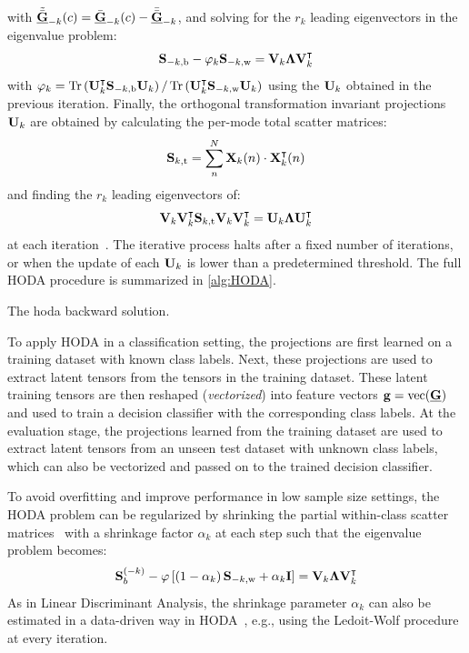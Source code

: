 with $\tilde{\bar{\underline{\mathbf{G}}}}_{-k}(c) = \bar{\underline{\mathbf{G}}}_{-k}(c) - \bar{\bar{\underline{\mathbf{G}}}}_{-k}$,
and solving for the $r_k$ leading eigenvectors in the eigenvalue problem:
\begin{equation}
	\mathbf{S}_{-k,\text{b}}-\varphi_k\mathbf{S}_{-k,\text{w}} =
	\mathbf{V}_k\mathbf{\Lambda}\mathbf{V}_k^\intercal
\end{equation}
with $\varphi_k=\operatorname{Tr}\left(\mathbf{U}_k^\intercal\mathbf{S}_{-k,\text{b}}\mathbf{U}_k\right)/\operatorname{Tr}\left(\mathbf{U}_k^\intercal\mathbf{S}_{-k,\text{w}}\mathbf{U}_k\right)$
using the $\mathbf{U}_k$ obtained in the previous iteration.
Finally, the orthogonal transformation invariant projections $\mathbf{U}_k$
are obtained by calculating the
per-mode total scatter matrices:
\begin{equation}
  \mathbf{S}_{k,\text{t}} = \sum_n^N\mathbf{X}_k(n)\cdot\mathbf{X}_k^\intercal(n)
\end{equation}
and finding the $r_k$ leading eigenvectors of:
\begin{equation}
	\mathbf{V}_k\mathbf{V}_k^\intercal\mathbf{S}_{k,\text{t}}\mathbf{V}_k\mathbf{V}_k^\intercal
	= \mathbf{U}_k\mathbf{\Lambda}\mathbf{U}_k^\intercal
\end{equation}
at each iteration~\cite{Wang2007}.
The iterative process halts after a fixed number of iterations, or when the
update of each $\mathbf{U}_k$ is lower than a predetermined threshold.
The full HODA procedure is summarized in \cref{alg:HODA}.
\begin{algorithm}
  \caption[A \acs{hoda} backward solution.]{The \acs{hoda} backward solution.}
	\label{alg:HODA}
	
\end{algorithm}

To apply HODA in a classification setting, the projections
are first learned on a training dataset with known class labels.
Next, these projections are used to extract latent tensors from the
tensors in the training dataset.
These latent training tensors are then reshaped (\emph{vectorized}) into feature vectors
$\mathbf{g} =  \operatorname{vec}(\underline{\mathbf{G}})$ and used to train a decision classifier with the corresponding class labels.
At the evaluation stage, the projections learned from the training dataset are
used to extract latent tensors from an unseen test dataset with unknown class
labels, which can also be vectorized and passed on to the trained decision
classifier.

To avoid overfitting and improve performance in low sample size settings, the
HODA problem can be regularized by shrinking the partial
within-class scatter matrices~\cite{Phan2010} with a shrinkage factor
$\alpha_k$ at each step such that the eigenvalue problem becomes:
\begin{equation}
	\mathbf{S}_b^{(-k)} -
	\varphi\left[\left(1-\alpha_k\right)\mathbf{S}_{-k,\text{w}}+\alpha_k\mathbf{I}\right] =
	\mathbf{V}_k\mathbf{\Lambda}\mathbf{V}_k^\intercal
\end{equation}
As in Linear Discriminant Analysis, the shrinkage parameter $\alpha_k$ can
also be estimated in a data-driven way in HODA~\cite{Jorajuria2022},
e.g., using the Ledoit-Wolf procedure~\cite{Ledoit2003} at every iteration.

